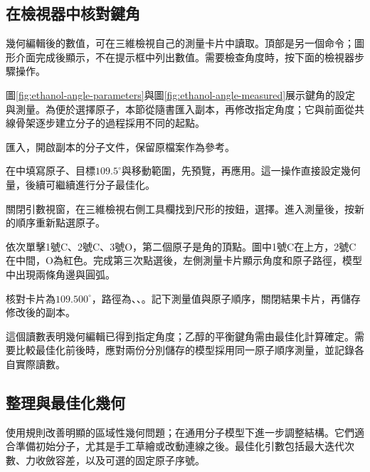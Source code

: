 \subsection{在檢視器中核對鍵角}

幾何編輯後的數值，可在三維檢視自己的測量卡片中讀取。頂部是另一個命令；圖形介面完成後顯示，不在提示框中列出數值。需要檢查角度時，按下面的檢視器步驟操作。

圖\ref{fig:ethanol-angle-parameters}與圖\ref{fig:ethanol-angle-measured}展示鍵角的設定與測量。為便於選擇原子，本節從隨書\mbox{}匯入副本，再修改指定角度；它與前面從共線骨架逐步建立分子的過程採用不同的起點。

\begin{steps}
  \item 匯入\mbox{}，開啟副本的分子文件，保留原檔案作為參考。
  \item 在中填寫原子、目標$109.5^\circ$與移動範圍，先預覽，再應用。這一操作直接設定幾何量，後續可繼續進行分子最佳化。
\end{steps}



\begin{steps}[resume]
  \item 關閉引數視窗，在三維檢視右側工具欄找到尺形的按鈕，選擇。進入測量後，按新的順序重新點選原子。
  \item 依次單擊1號C、2號C、3號O，第二個原子是角的頂點。圖中1號C在上方，2號C在中間，O為紅色。完成第三次點選後，左側測量卡片顯示角度和原子路徑，模型中出現兩條角邊與圓弧。
  \item 核對卡片為$109.500^\circ$，路徑為、、。記下測量值與原子順序，關閉結果卡片，再儲存修改後的副本。
\end{steps}

這個讀數表明幾何編輯已得到指定角度；乙醇的平衡鍵角需由最佳化計算確定。需要比較最佳化前後時，應對兩份分別儲存的模型採用同一原子順序測量，並記錄各自實際讀數。



\subsection{整理與最佳化幾何}

使用規則改善明顯的區域性幾何問題；在通用分子模型下進一步調整結構。它們適合準備初始分子，尤其是手工草繪或改動連線之後。最佳化引數包括最大迭代次數、力收斂容差，以及可選的固定原子序號。

